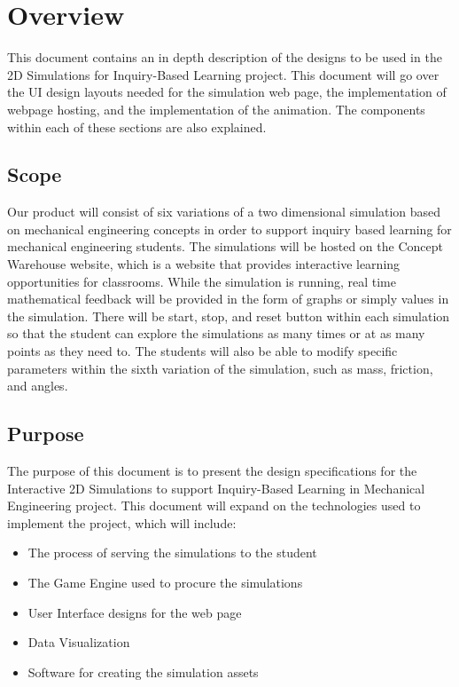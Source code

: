 \documentclass[onecolumn, draftclsnofoot,10pt, compsoc]{IEEEtran}
\begin{document}
\section{Overview}
This document contains an in depth description of the designs to be used in the 2D Simulations for Inquiry-Based Learning project. This document will go over the UI design layouts needed for the simulation web page, the implementation of webpage hosting, and the implementation of the animation. The components within each of these sections are also explained. 

\subsection{Scope}
Our product will consist of six variations of a two dimensional simulation based on mechanical engineering concepts in order to support inquiry based learning for mechanical engineering students. The simulations will be hosted on the Concept Warehouse website, which is a website that provides interactive learning opportunities for classrooms. While the simulation is running, real time mathematical feedback will be provided in the form of graphs or simply values in the simulation. There will be start, stop, and reset button within each simulation so that the student can explore the simulations as many times or at as many points as they need to. The students will also be able to modify specific parameters within the sixth variation of the simulation, such as mass, friction, and angles.

\subsection{Purpose}
The purpose of this document is to present the design specifications for the Interactive 2D Simulations to support Inquiry-Based Learning in Mechanical Engineering project. This document will expand on the technologies used to implement the project, which will include:

\begin{itemize}
  \item The process of serving the simulations to the student
  \item The Game Engine used to procure the simulations
  \item User Interface designs for the web page
  \item Data Visualization
  \item Software for creating the simulation assets
\end{itemize} 
\end{document}
